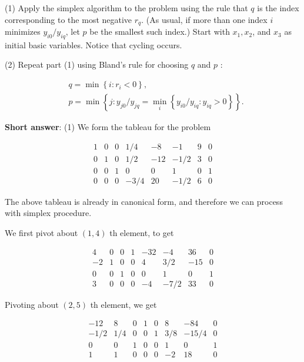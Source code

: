 (1) Apply the simplex algorithm to the problem using the rule that \(q\) is the index corresponding to the most negative \(r_{q}\). (As usual, if more than one index \(i\) minimizes \(y_{i 0} / y_{i q}\), let \(p\) be the smallest such index.) Start with \(x_{1}, x_{2}\), and \(x_{3}\) as initial basic variables. Notice that cycling occurs.

(2) Repeat part (1) using Bland's rule for choosing \(q\) and \(p\) :

\begin{equation*}
	\begin{aligned}
		& q=\min \left\{i: r_{i}<0\right\}, \\
		& p=\min \left\{j: y_{j 0} / y_{j q}=\min _{i}\left\{y_{i 0} / y_{i q}: y_{i q}>0\right\}\right\} .
	\end{aligned}
\end{equation*}

\textbf{Short answer}:
(1) We form the tableau for the problem

\begin{equation*}
	\begin{array}{cccccccc}
		1 & 0 & 0 & 1 / 4 & -8 & -1 & 9 & 0 \\
		0 & 1 & 0 & 1 / 2 & -12 & -1 / 2 & 3 & 0 \\
		0 & 0 & 1 & 0 & 0 & 1 & 0 & 1 \\
		0 & 0 & 0 & -3 / 4 & 20 & -1 / 2 & 6 & 0
	\end{array}
\end{equation*}

The above tableau is already in canonical form, and therefore we can process with simplex procedure.

We first pivot about \((1,4)\) th element, to get

\begin{equation*}
	\begin{array}{cccccccc}
		4 & 0 & 0 & 1 & -32 & -4 & 36 & 0 \\
		-2 & 1 & 0 & 0 & 4 & 3 / 2 & -15 & 0 \\
		0 & 0 & 1 & 0 & 0 & 1 & 0 & 1 \\
		3 & 0 & 0 & 0 & -4 & -7 / 2 & 33 & 0
	\end{array}
\end{equation*}

Pivoting about \((2,5)\) th element, we get

\begin{equation*}
	\begin{array}{cccccccc}
		-12 & 8 & 0 & 1 & 0 & 8 & -84 & 0 \\
		-1 / 2 & 1 / 4 & 0 & 0 & 1 & 3 / 8 & -15 / 4 & 0 \\
		0 & 0 & 1 & 0 & 0 & 1 & 0 & 1 \\
		1 & 1 & 0 & 0 & 0 & -2 & 18 & 0
	\end{array}
\end{equation*}

